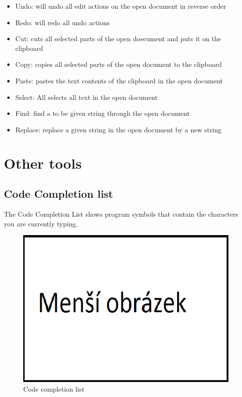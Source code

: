                     \begin{itemize}
                        \item Undo: will undo all edit actions on the open document in reverse order
                        \item Redo: will redo all undo actions
                        \item Cut: cuts all selected parts of the open doecument and puts it on the clipboard
                        \item Copy: copies all selected parts of the open document to the clipboard
                        \item Paste: pastes the text contents of the clipboard in the open document
                        \item Select: All selects all text in the open document
                        \item Find: find a to be given string through the open document
                        \item Replace: replace a given string in the open document by a new string
                    \end{itemize}

         \section{Other tools}
                \subsection{Code Completion list}
                The Code Completion List shows program symbols that contain
                the characters you are currently typing.
                        \begin{figure}
                            \centering{}
                            \includegraphics [scale=0.3]{img/mensi_obrazek.png}
                            \caption{Code completion list}
                        \end{figure}

